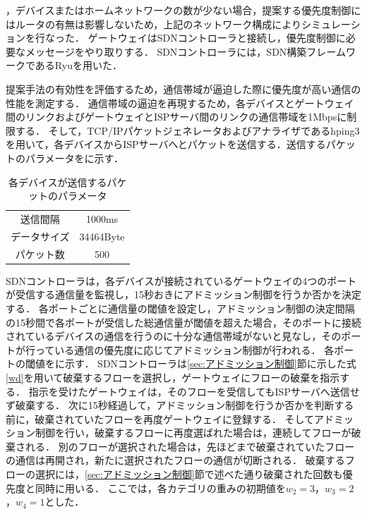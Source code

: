 \documentclass[a4paper,11pt,uplatex]{ujreport}
\begin{document}
  ，デバイスまたはホームネットワークの数が少ない場合，提案する優先度制御にはルータの有無は影響しないため，上記のネットワーク構成によりシミュレーションを行なった．
  ゲートウェイはSDNコントローラと接続し，優先度制御に必要なメッセージをやり取りする．
  SDNコントローラには，SDN構築フレームワークであるRyu\cite{Ryu}を用いた．\par

  提案手法の有効性を評価するため，通信帯域が逼迫した際に優先度が高い通信の性能を測定する．
  通信帯域の逼迫を再現するため，各デバイスとゲートウェイ間のリンクおよびゲートウェイとISPサーバ間のリンクの通信帯域を1Mbpsに制限する．
  そして，TCP/IPパケットジェネレータおよびアナライザであるhping3\cite{hping3}を用いて，各デバイスからISPサーバへとパケットを送信する．送信するパケットのパラメータをに示す．

  \begin{table}[!tb]
    \caption{各デバイスが送信するパケットのパラメータ}
    \label{tab:packetParameter}
    \centering
    \begin{tabular}{cc}
      \hline
      送信間隔 & 1000ms\\
      データサイズ & 34464Byte\\
      パケット数 & 500\\
      \hline
    \end{tabular}
  \end{table}

  SDNコントローラは，各デバイスが接続されているゲートウェイの4つのポートが受信する通信量を監視し，15秒おきにアドミッション制御を行うか否かを決定する．
  各ポートごとに通信量の閾値を設定し，アドミッション制御の決定間隔の15秒間で各ポートが受信した総通信量が閾値を超えた場合，そのポートに接続されているデバイスの通信を行うのに十分な通信帯域がないと見なし，そのポートが行っている通信の優先度に応じてアドミッション制御が行われる．
  各ポートの閾値をに示す．
  SDNコントローラは\ref{sec:アドミッション制御}節に示した式\ref{wd}を用いて破棄するフローを選択し，ゲートウェイにフローの破棄を指示する．
  指示を受けたゲートウェイは，そのフローを受信してもISPサーバへ送信せず破棄する．
  次に15秒経過して，アドミッション制御を行うか否かを判断する前に，破棄されていたフローを再度ゲートウェイに登録する．
  そしてアドミッション制御を行い，破棄するフローに再度選ばれた場合は，連続してフローが破棄される．
  別のフローが選択された場合は，先ほどまで破棄されていたフローの通信は再開され，新たに選択されたフローの通信が切断される．
  破棄するフローの選択には，\ref{sec:アドミッション制御}節で述べた通り破棄された回数も優先度と同時に用いる．
  ここでは，各カテゴリの重みの初期値を$w_2=3$，$w_3=2$，$w_4=1$とした．\par
\end{document}

